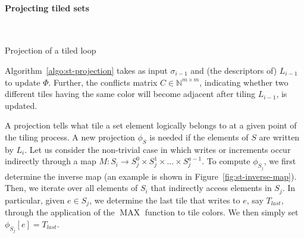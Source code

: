 \paragraph{Projecting tiled sets}

\begin{algorithm}[t]
\nonl ~\\
\caption{Projection of a tiled loop}
\label{algo:st-projection}
\end{algorithm}

Algorithm~\ref{algo:st-projection} takes as input $\sigma_{i-1}$ and (the descriptors of) $L_{i-1}$ to update $\Phi$. Further, the conflicts matrix $C \in \mathbb{N}^{m \times m}$, indicating whether two different tiles having the same color will become adjacent after tiling $L_{i-1}$, is updated. 

A projection tells what tile a set element logically belongs to at a given point of the tiling process. A new projection $\phi_{S}$ is needed if the elements of $S$ are written by $L_i$. Let us consider the non-trivial case in which writes or increments occur indirectly through a map $M : S_i \rightarrow S_j^0 \times S_j^1 \times ... \times S_j^{a-1}$. To compute $\phi_{S_{j}}$, we first determine the inverse map (an example is shown in Figure~\ref{fig:st-inverse-map}). Then, we iterate over all elements of $S_i$ that indirectly access elements in $S_j$. In particular, given $e \in S_j$, we determine the last tile that writes to $e$, say $T_{last}$, through the application of the $\operatorname{MAX}$ function to tile colors. We then simply set $\phi_{S_{j}}[e] = T_{last}$. 


